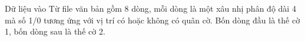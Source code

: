 Dữ liệu vào
Từ file văn bản gồm 8 dòng, mỗi dòng là một xâu nhị phân độ dài 4 mà số 1/0 tương ứng với vị trí có hoặc không có quân cờ. Bốn dòng đầu là thế cờ 1, bốn dòng sau là thế cờ 2.